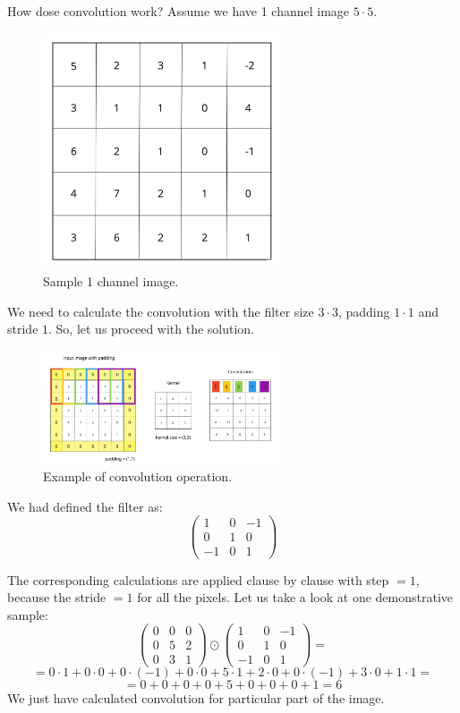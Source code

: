 How dose convolution work? Assume we have 1 channel image $5 \cdot 5$.
\begin{figure}[h]
    \centering \includegraphics[width=7cm]{images/1_channel.jpg}
    \caption {Sample 1 channel image.}
\end{figure}

We need to calculate the convolution with the filter size $3 \cdot 3$, padding $1 \cdot 1$ and stride $1$. So, let us proceed with the solution. 
\begin{figure}[h]
    \centering \includegraphics[width=7cm]{images/convolution.jpg}
    \caption {Example of convolution operation.}
\end{figure}

We had defined the filter as: 
\[ \begin{pmatrix} 1 & 0 & -1 \\ 0 & 1 & 0 \\ -1 & 0 & 1 \end{pmatrix} \]

The corresponding calculations are applied clause by clause with step $= 1$, because the stride $= 1$ for all the pixels. Let us take a look at one demonstrative sample:   
\[ \begin{pmatrix} 0 & 0 & 0 \\ 0 & 5 & 2 \\ 0 & 3 & 1 \end{pmatrix} \odot \begin{pmatrix} 1 & 0 & -1 \\ 0 & 1 & 0 \\ -1 & 0 & 1 \end{pmatrix} = \]
\[ = 0 \cdot 1 + 0 \cdot 0 + 0 \cdot (-1) + 0 \cdot 0 + 5 \cdot 1 + 2 \cdot 0 + 0 \cdot (-1) + 3 \cdot 0 + 1 \cdot 1 = \] 
\[ = 0 + 0 + 0 + 0 + 5 + 0 + 0 + 0 + 1= 6 \]
We just have calculated convolution for particular part of the image. 

